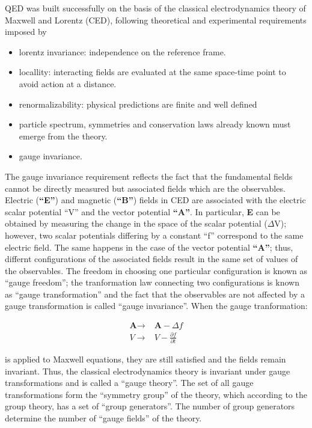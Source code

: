\noindent QED was built successfully on the basis of the classical electrodynamics theory of Maxwell and Lorentz (CED), following theoretical and experimental requirements imposed by

\begin{itemize}
\item lorentz invariance: independence on the reference frame.  
\item locallity: interacting fields are evaluated at the same space-time point to avoid action at a distance. 
\item renormalizability: physical predictions are finite and well defined 
\item particle spectrum, symmetries and conservation laws already known must emerge from the theory.
\item gauge invariance.
\end{itemize}

\noindent The gauge invariance requirement reflects the fact that the fundamental fields cannot be directly measured but associated fields which are the observables. Electric (\textbf{``E''}) and magnetic (\textbf{``B''}) fields in CED are associated with the electric scalar potential ``V'' and the vector potential \textbf{``A''}. In particular, \textbf{E} can be obtained by measuring the change in the space of the scalar potential (\textbf{$\Delta$}V); however, two scalar potentials differing by a constant ``f'' correspond to the same electric field. The same happens in the case of the vector potential \textbf{``A''}; thus, differnt configurations of the associated fields result in the same set of values of the observables. The freedom in choosing one particular configuration is known as ``gauge freedom''; the tranformation law connecting two configurations is known as ``gauge transformation'' and the fact that the observables are not affected by a gauge transformation is called ``gauge invariance''.
\noindent When the gauge tranformation:  

\begin{align}\label{cov_der}
\textbf{A} \to &\textbf{A} -\Delta f\nonumber\\
V \to & V - \frac{\partial f}{\partial t}
\end{align}

\noindent is applied to Maxwell equations, they are still satisfied and the fields remain invariant. Thus, the classical electrodynamics theory is invariant under gauge transformations and is called a ``gauge theory''. The set of all gauge transformations form the ``symmetry group'' of the theory, which according to the group theory, has a set of ``group generators''. The number of group generators determine the number of ``gauge fields'' of the theory.

